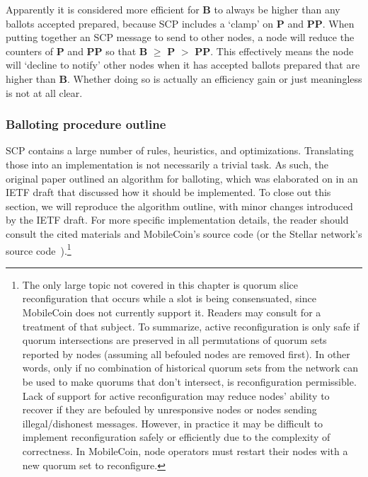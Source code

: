 \begin{enumerate}
    Apparently it is considered more efficient for \textbf{B} to always be higher than any ballots accepted prepared, because SCP includes a `clamp' on \textbf{P} and \textbf{PP}. When putting together an SCP message to send to other nodes, a node will reduce the counters of \textbf{P} and \textbf{PP} so that \textbf{B} $\geq$ \textbf{P} $>$ \textbf{PP}. This effectively means the node will `decline to notify' other nodes when it has accepted ballots prepared that are higher than \textbf{B}. Whether doing so is actually an efficiency gain or just meaningless is not at all clear.
\end{enumerate}

\subsubsection{Balloting procedure outline}

SCP contains a large number of rules, heuristics, and optimizations. Translating those into an implementation is not necessarily a trivial task. As such, the original paper \cite{stellar-consensus-protocol} outlined an algorithm for balloting, which was elaborated on in an IETF draft \cite{scp-ietf-draft} that discussed how it should be implemented. To close out this section, we will reproduce the algorithm outline, with minor changes introduced by the IETF draft. For more specific implementation details, the reader should consult the cited materials and MobileCoin's source code \cite{mobilecoin-source-code} (or the Stellar network's source code~\cite{stellar-network-source-code}).\footnote{The only large topic not covered in this chapter is quorum slice reconfiguration that occurs while a slot is being consensuated, since MobileCoin does not currently support it. Readers may consult \cite{stellar-consensus-protocol} for a treatment of that subject. To summarize, active reconfiguration is only safe if quorum intersections are preserved in all permutations of quorum sets reported by nodes (assuming all befouled nodes are removed first). In other words, only if no combination of historical quorum sets from the network can be used to make quorums that don't intersect, is reconfiguration permissible. Lack of support for active reconfiguration may reduce nodes' ability to recover if they are befouled by unresponsive nodes or nodes sending illegal/dishonest messages. However, in practice it may be difficult to implement reconfiguration safely or efficiently due to the complexity of correctness. In MobileCoin, node operators must restart their nodes with a new quorum set to reconfigure.}

